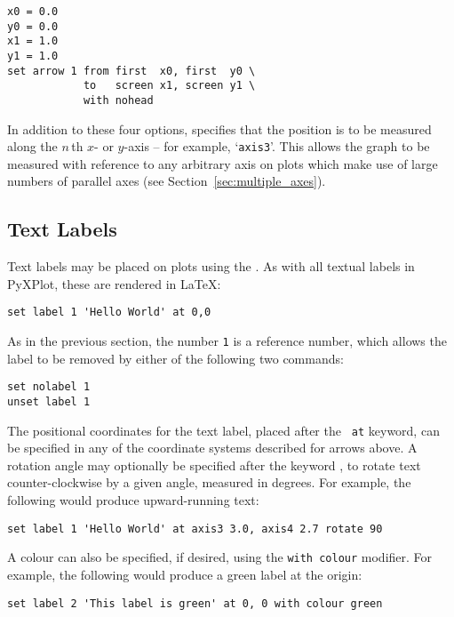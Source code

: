 \begin{verbatim}
x0 = 0.0
y0 = 0.0
x1 = 1.0
y1 = 1.0
set arrow 1 from first  x0, first  y0 \
            to   screen x1, screen y1 \
            with nohead
\end{verbatim}

In addition to these four options,  specifies that the
position is to be measured along the $n\,$th $x$- or $y$-axis -- for example,
`{\tt axis3}'.\indcmd{set arrow} This allows the graph to be measured with
reference to any arbitrary axis on plots which make use of large numbers of
parallel axes (see Section~\ref{sec:multiple_axes}).

\subsection{Text Labels}

Text labels may be placed on plots using the . As with all
textual labels in PyXPlot, these are rendered in \LaTeX:

\begin{verbatim}
set label 1 'Hello World' at 0,0
\end{verbatim}

As in the previous section, the number {\tt 1} is a reference number, which
allows the label to be removed by either of the following two commands:

\begin{verbatim}
set nolabel 1
unset label 1
\end{verbatim}

\noindent The positional coordinates for the text label, placed after the {\tt
at} keyword, can be specified in any of the coordinate systems described for
arrows above. A rotation angle may optionally be specified after the keyword
\indkeyt{rotate}, to rotate text counter-clockwise by a given angle, measured
in degrees. For example, the following would produce upward-running text:

\begin{verbatim}
set label 1 'Hello World' at axis3 3.0, axis4 2.7 rotate 90
\end{verbatim}

A colour can also be specified, if desired, using the {\tt with colour}
modifier.  For example, the following would produce a green label at the origin:

\begin{verbatim}
set label 2 'This label is green' at 0, 0 with colour green
\end{verbatim}

